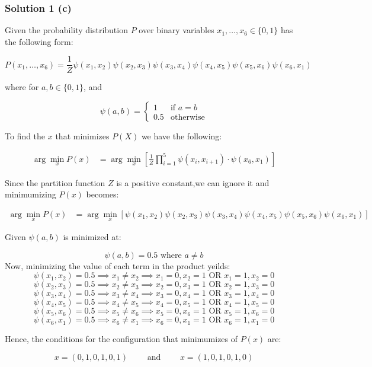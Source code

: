 \documentclass{article}
\begin{document}
\subsubsection*{Solution 1 (c)}
\begin{flushleft}
    Given the probability distribution $P$ over binary variables $x_1, \ldots, x_6 \in \{0, 1\}$ has the following form:
\end{flushleft}
$$
P(x_1, \ldots, x_6) = \frac{1}{Z} \psi(x_1, x_2)\psi(x_2, x_3)\psi(x_3, x_4)\psi(x_4, x_5)\psi(x_5, x_6)\psi(x_6, x_1)
$$
\begin{flushleft}
    where for $a, b \in \{0, 1\}$, and
\end{flushleft}
$$
\psi(a, b) = \begin{cases}
1 & \text{if } a = b\\
0.5 & \text{otherwise}
\end{cases}
$$
\begin{flushleft}
    To find the $x$ that minimizes $P(X)$ we have the following:
\end{flushleft}
\begin{align*}
    \arg\min_{x} P(x) &= \arg\min_{x} \left[ \frac{1}{Z} \prod_{i=1}^{5} \psi(x_i, x_{i+1}) \cdot \psi(x_6, x_1) \right]
\end{align*}
\begin{flushleft}
    Since the partition function $Z$ is a positive constant,we can ignore it and minimumizing $P(x)$ becomes:
\end{flushleft}
\begin{align*}
    \arg\min_{x} P(x) &= \arg\min_{x} \left[ \psi(x_1, x_2)\psi(x_2, x_3)\psi(x_3, x_4)\psi(x_4, x_5)\psi(x_5, x_6)\psi(x_6, x_1) \right]
\end{align*}
\begin{flushleft}
    Given $\psi(a,b)$ is minimized at:
\end{flushleft}
$$\psi(a, b) = 0.5 \text{ where } a \neq b$$
Now, minimizing the value of each term in the product yeilds:
$$\psi(x_1, x_2) = 0.5 \implies  x_1 \neq x_2 \implies x_1 = 0 , x_2 = 1 \text{ OR } x_1 = 1 , x_2 = 0 $$
$$\psi(x_2, x_3) = 0.5 \implies  x_2 \neq x_3 \implies x_2 = 0 , x_3 = 1 \text{ OR } x_2 = 1 , x_3 = 0 $$
$$\psi(x_3, x_4) = 0.5 \implies  x_3 \neq x_4 \implies x_3 = 0 , x_4 = 1 \text{ OR } x_3 = 1 , x_4 = 0 $$
$$\psi(x_4, x_5) = 0.5 \implies  x_4 \neq x_5 \implies x_4 = 0 , x_5 = 1 \text{ OR } x_4 = 1 , x_5 = 0 $$
$$\psi(x_5, x_6) = 0.5 \implies  x_5 \neq x_6 \implies x_5 = 0 , x_6 = 1 \text{ OR } x_5 = 1 , x_6 = 0 $$
$$\psi(x_6, x_1) = 0.5 \implies  x_6 \neq x_1 \implies x_6 = 0 , x_1 = 1 \text{ OR } x_6 = 1 , x_1 = 0 $$
\begin{flushleft}
    Hence, the conditions for the configuration that minimumizes of $P(x)$ are: 
\end{flushleft}
$$x = (0, 1, 0, 1, 0, 1) \qquad \text{ and } \qquad x = (1, 0, 1, 0, 1, 0)$$
\end{document}
